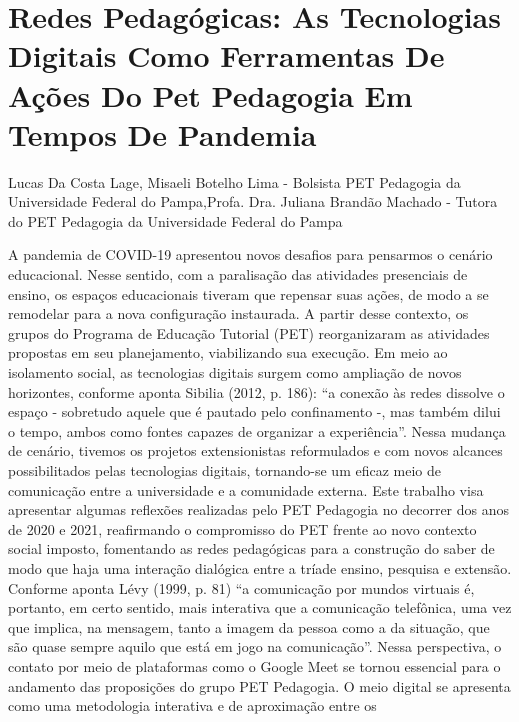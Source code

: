 


\section*{Redes Pedagógicas: As Tecnologias Digitais Como Ferramentas De Ações Do Pet Pedagogia Em Tempos De Pandemia}

Lucas Da Costa Lage, Misaeli Botelho Lima - Bolsista PET Pedagogia da Universidade Federal do Pampa,Profa. Dra. Juliana Brandão Machado - Tutora do PET Pedagogia da Universidade Federal do Pampa

A pandemia de COVID-19 apresentou novos desafios para pensarmos o cenário
educacional. Nesse sentido, com a paralisação das atividades presenciais de ensino, os espaços
educacionais tiveram que repensar suas ações, de modo a se remodelar para a nova configuração
instaurada. A partir desse contexto, os grupos do Programa de Educação Tutorial (PET)
reorganizaram as atividades propostas em seu planejamento, viabilizando sua execução.
Em meio ao isolamento social, as tecnologias digitais surgem como ampliação de novos
horizontes, conforme aponta Sibilia (2012, p. 186): “a conexão às redes dissolve o espaço -
sobretudo aquele que é pautado pelo confinamento -, mas também dilui o tempo, ambos como
fontes capazes de organizar a experiência”. Nessa mudança de cenário, tivemos os projetos
extensionistas reformulados e com novos alcances possibilitados pelas tecnologias digitais,
tornando-se um eficaz meio de comunicação entre a universidade e a comunidade externa.
Este trabalho visa apresentar algumas reflexões realizadas pelo PET Pedagogia no
decorrer dos anos de 2020 e 2021, reafirmando o compromisso do PET frente ao novo contexto
social imposto, fomentando as redes pedagógicas para a construção do saber de modo que haja
uma interação dialógica entre a tríade ensino, pesquisa e extensão.
Conforme aponta Lévy (1999, p. 81) “a comunicação por mundos virtuais é, portanto,
em certo sentido, mais interativa que a comunicação telefônica, uma vez que implica, na
mensagem, tanto a imagem da pessoa como a da situação, que são quase sempre aquilo que está
em jogo na comunicação”. Nessa perspectiva, o contato por meio de plataformas como o Google
Meet se tornou essencial para o andamento das proposições do grupo PET Pedagogia.
O meio digital se apresenta como uma metodologia interativa e de aproximação entre os
